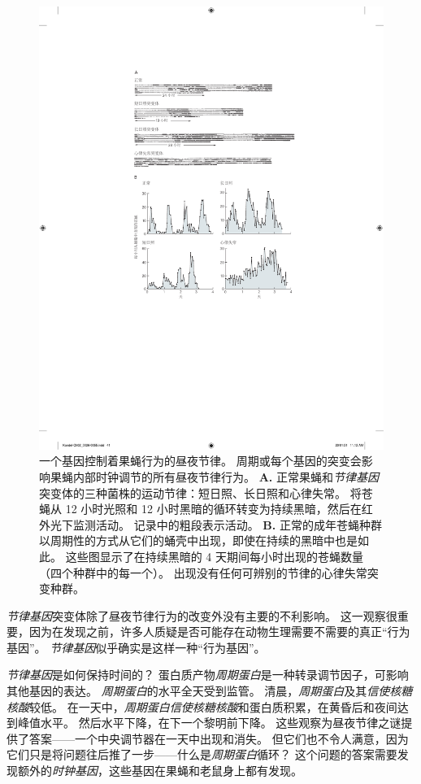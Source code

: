 \begin{figure}[htbp]
	\centering
	\includegraphics[width=0.6\linewidth]{chap02/fig_2_11}
	\caption{一个基因控制着果蝇行为的昼夜节律。
		周期或每个基因的突变会影响果蝇内部时钟调节的所有昼夜节律行为\cite{konopka1971clock}。
		\textbf{A.} 正常果蝇和\textit{节律基因}突变体的三种菌株的运动节律：短日照、长日照和心律失常。
		将苍蝇从 12 小时光照和 12 小时黑暗的循环转变为持续黑暗，然后在红外光下监测活动。
		记录中的粗段表示活动。
		\textbf{B.} 正常的成年苍蝇种群以周期性的方式从它们的蛹壳中出现，即使在持续的黑暗中也是如此。
		这些图显示了在持续黑暗的 4 天期间每小时出现的苍蝇数量（四个种群中的每一个）。
		出现没有任何可辨别的节律的心律失常突变种群。}
	\label{fig:2_11}
\end{figure}


\textit{节律基因}突变体除了昼夜节律行为的改变外没有主要的不利影响。
这一观察很重要，因为在发现之前，许多人质疑是否可能存在动物生理需要不需要的真正“行为基因”。
\textit{节律基因}似乎确实是这样一种“行为基因”。


\textit{节律基因}是如何保持时间的？
蛋白质产物\textit{周期蛋白}是一种转录调节因子，可影响其他基因的表达。
\textit{周期蛋白}的水平全天受到监管。
清晨，\textit{周期蛋白}及其\textit{信使核糖核酸}较低。
在一天中，\textit{周期蛋白}\textit{信使核糖核酸}和蛋白质积累，在黄昏后和夜间达到峰值水平。
然后水平下降，在下一个黎明前下降。
这些观察为昼夜节律之谜提供了答案——一个中央调节器在一天中出现和消失。
但它们也不令人满意，因为它们只是将问题往后推了一步——什么是\textit{周期蛋白}循环？
这个问题的答案需要发现额外的\textit{时钟基因}，这些基因在果蝇和老鼠身上都有发现。


